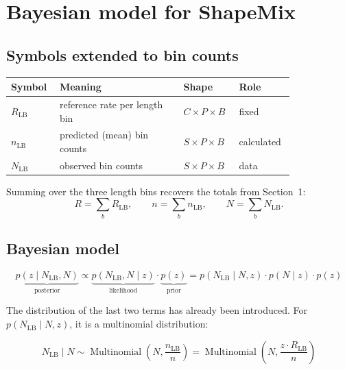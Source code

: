 \documentclass[11pt]{article}
\newcommand{\Mult}{\operatorname{Multinomial}}
\begin{document}
\section{Bayesian model for ShapeMix}

\subsection{Symbols extended to bin counts}

\begin{center}
\begin{tabular}{C{0.12\linewidth}L{0.40\linewidth}C{0.16\linewidth}L{0.14\linewidth}}
\toprule
Symbol & Meaning & Shape & Role \\
\midrule
\(R_{\mathrm{LB}}\) & reference rate per length bin & \(C\times P\times B\) & fixed \\
\(n_{\mathrm{LB}}\) & predicted (mean) bin counts & \(S\times P\times B\)  & calculated \\
\(N_{\mathrm{LB}}\) & observed bin counts & \(S\times P\times B\)  & data \\
\bottomrule
\end{tabular}
\end{center}

Summing over the three length bins recovers the totals from Section~1:
\[
R=\sum_b R_{\mathrm{LB}},
\qquad
n=\sum_b n_{\mathrm{LB}},
\qquad
N=\sum_b N_{\mathrm{LB}}.
\]

\subsection{Bayesian model}

\[
\underbrace{p(z\mid N_{\mathrm{LB}}, N)}_{\text{posterior}}
\propto
\underbrace{p(N_{\mathrm{LB}}, N \mid z)}_{\text{likelihood}} \cdot
\underbrace{p(z)}_{\text{prior}} = p(N_{\mathrm{LB}} \mid N, z) \cdot p(N \mid z) \cdot p(z)
\]

The distribution of the last two terms has already been introduced. For $p(N_{\mathrm{LB}} \mid N, z)$, it is a multinomial distribution:

\[
\boxed{
N_{\mathrm{LB}}\mid N
\sim
\Mult(N,\frac{n_{\mathrm{LB}}}{n})=\Mult(N,\frac{z \cdot R_{\mathrm{LB}}}{n})
}
\]

\end{document}
